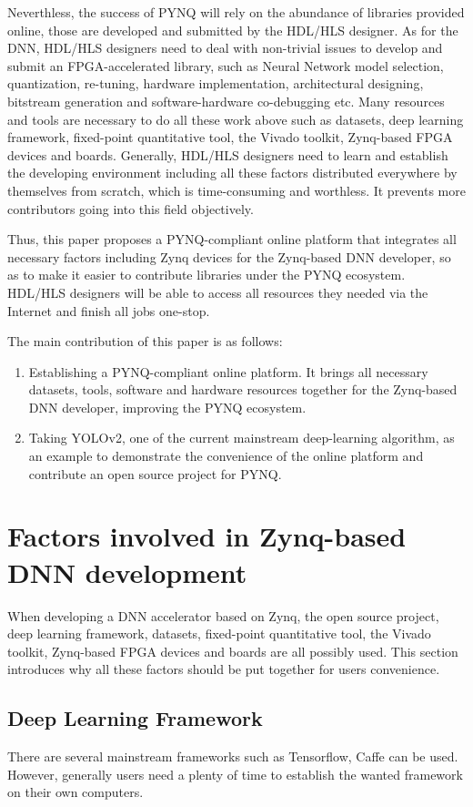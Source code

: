 Neverthless, the success of PYNQ will rely on the abundance of libraries provided online, those are developed and submitted by the HDL/HLS designer. As for the DNN, HDL/HLS designers need to deal with non-trivial issues to develop and submit an FPGA-accelerated library, such as Neural Network model selection, quantization, re-tuning, hardware implementation, architectural designing, bitstream generation and software-hardware co-debugging etc. Many resources and tools are necessary to do all these work above such as datasets, deep learning framework, fixed-point quantitative tool, the Vivado toolkit, Zynq-based FPGA devices and boards. Generally, HDL/HLS designers need to learn and establish the developing environment including all these factors distributed everywhere by themselves from scratch, which is time-consuming and worthless. It prevents more contributors going into this field objectively.

Thus, this paper proposes a PYNQ-compliant online platform that integrates all necessary factors including Zynq devices for the Zynq-based DNN developer, so as to make it easier to contribute libraries under the PYNQ ecosystem. HDL/HLS designers will be able to access all resources they needed via the Internet and finish all jobs one-stop.

The main contribution of this paper is as follows:
\begin{enumerate}
    \item Establishing a PYNQ-compliant online platform. It brings all necessary datasets, tools, software and hardware resources together for the Zynq-based DNN developer, improving the PYNQ ecosystem.
    \item Taking YOLOv2, one of the current mainstream deep-learning algorithm, as an example to demonstrate the convenience of the online platform and contribute an open source project for PYNQ.
\end{enumerate}

\section{Factors involved in Zynq-based DNN development}
 When developing a DNN accelerator based on Zynq, the open source project, deep learning framework, datasets, fixed-point quantitative tool, the Vivado toolkit, Zynq-based FPGA devices and boards are all possibly used. This section introduces why all these factors should be put together for users convenience.

\subsection{Deep Learning Framework}
There are several mainstream frameworks such as Tensorflow, Caffe can be used. However, generally users need a plenty of time to establish the wanted framework on their own computers. 

